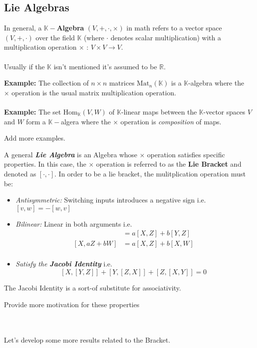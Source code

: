 \documentclass[11pt]{article}
\begin{document}
\subsection{Lie Algebras}
In general, a $\mathbb{K}-$\textbf{Algebra} $(V, +, \cdot, \times)$ in math refers to a vector space $(V, +, \cdot)$ over the field $\mathbb{K}$ (where $\cdot$ denotes scalar multiplication) with a multiplication operation $\times \text{ : } V \times V \rightarrow V$.
\\
\\
Usually if the $\mathbb{K}$ isn't mentioned it's assumed to be $\mathbb{R}$.
\begin{dottedbox}
  \textbf{Example:} The collection of $n \times n$ matrices $\mathrm{Mat}_n(\mathbb{K})$ is a $\mathbb{K}$-algebra where the $\times$ operation is the usual matrix multiplication operation.
  \\
  \\
  \textbf{Example:} The set $\mathrm{Hom}_{\mathbb{K}}(V, W)$ of $\mathbb{K}$-linear maps between the $\mathbb{K}$-vector spaces $V$ and $W$ form a $\mathbb{K}-$algera where the $\times$ operation is \emph{composition} of maps.
  \\
  \begin{note}
    {Add more examples.}
  \end{note}
\end{dottedbox}

\vskip 0.5cm
A general \textbf{\emph{Lie Algebra}} is an Algebra whose $\times$ operation satisfies specific properties. In this case, the $\times$ operation is referred to as the \textbf{Lie Bracket} and denoted as $[\cdot, \cdot]$. In order to be a lie bracket, the mulitplication operation must be:
\begin{itemize}
  \item \textit{Antisymmetric:} Switching inputs introduces a negative sign i.e. $[v, w] = - [w, v]$
  \item \textit{Bilinear:} Linear in both arguments i.e. 
  \begin{align*}
    [aX + bY, Z] &= a[X, Z] + b[Y, Z] \\
    [X, aZ + bW] &= a[X, Z] + b[X, W] \\
  \end{align*}
  \item\textit{ Satisfy the \textbf{Jacobi Identity}} i.e.
  \[ [X, [Y, Z]] + [Y, [Z, X]] + [Z, [X, Y]] = 0  \]
\end{itemize}
The Jacobi Identity is a sort-of substitute for associativity.
\begin{note}
  {Provide more motivation for these properties}
\end{note}
\\
\\
Let's develop some more results related to the Bracket.
\\
\end{document}
